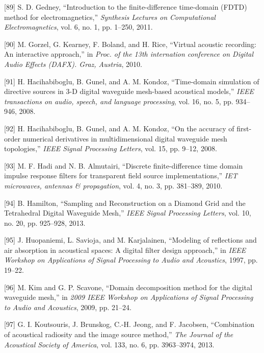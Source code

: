 \documentclass[]{scrreprt}
\begin{document}
\hypertarget{ref-gedneyux5fintroductionux5f2011}{}
{[}89{]} S. D. Gedney, ``Introduction to the finite-difference
time-domain (FDTD) method for electromagnetics,'' \emph{Synthesis
Lectures on Computational Electromagnetics}, vol. 6, no. 1, pp. 1--250,
2011.

\hypertarget{ref-gorzelux5fvirtualux5f2010}{}
{[}90{]} M. Gorzel, G. Kearney, F. Boland, and H. Rice, ``Virtual
acoustic recording: An interactive approach,'' in \emph{Proc. of the
13th internation conference on Digital Audio Effects (DAFX). Graz,
Austria}, 2010.

\hypertarget{ref-hacihabibogluux5ftime-domainux5f2008}{}
{[}91{]} H. Hacihabiboglu, B. Gunel, and A. M. Kondoz, ``Time-domain
simulation of directive sources in 3-D digital waveguide mesh-based
acoustical models,'' \emph{IEEE transactions on audio, speech, and
language processing}, vol. 16, no. 5, pp. 934--946, 2008.

\hypertarget{ref-hacihabibogluux5faccuracyux5f2008}{}
{[}92{]} H. Hacihabiboglu, B. Gunel, and A. M. Kondoz, ``On the accuracy
of first-order numerical derivatives in multidimensional digital
waveguide mesh topologies,'' \emph{IEEE Signal Processing Letters}, vol.
15, pp. 9--12, 2008.

\hypertarget{ref-hadiux5fdiscreteux5f2010}{}
{[}93{]} M. F. Hadi and N. B. Almutairi, ``Discrete finite-difference
time domain impulse response filters for transparent field source
implementations,'' \emph{IET microwaves, antennas \& propagation}, vol.
4, no. 3, pp. 381--389, 2010.

\hypertarget{ref-hamiltonux5fsamplingux5f2013}{}
{[}94{]} B. Hamilton, ``Sampling and Reconstruction on a Diamond Grid
and the Tetrahedral Digital Waveguide Mesh,'' \emph{IEEE Signal
Processing Letters}, vol. 10, no. 20, pp. 925--928, 2013.

\hypertarget{ref-huopaniemiux5fmodelingux5f1997}{}
{[}95{]} J. Huopaniemi, L. Savioja, and M. Karjalainen, ``Modeling of
reflections and air absorption in acoustical spaces: A digital filter
design approach,'' in \emph{IEEE Workshop on Applications of Signal
Processing to Audio and Acoustics}, 1997, pp. 19--22.

\hypertarget{ref-kimux5fdomainux5f2009}{}
{[}96{]} M. Kim and G. P. Scavone, ``Domain decomposition method for the
digital waveguide mesh,'' in \emph{2009 IEEE Workshop on Applications of
Signal Processing to Audio and Acoustics}, 2009, pp. 21--24.

\hypertarget{ref-koutsourisux5fcombinationux5f2013}{}
{[}97{]} G. I. Koutsouris, J. Brunskog, C.-H. Jeong, and F. Jacobsen,
``Combination of acoustical radiosity and the image source method,''
\emph{The Journal of the Acoustical Society of America}, vol. 133, no.
6, pp. 3963--3974, 2013.
\end{document}
